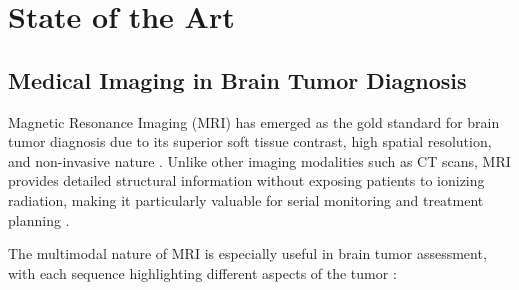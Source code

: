 \chapter{State of the Art}

\section{Medical Imaging in Brain Tumor Diagnosis}

Magnetic Resonance Imaging (MRI) has emerged as the gold standard for brain tumor diagnosis due to its superior soft tissue contrast, high spatial resolution, and non-invasive nature \cite{Bauer2013}. Unlike other imaging modalities such as CT scans, MRI provides detailed structural information without exposing patients to ionizing radiation, making it particularly valuable for serial monitoring and treatment planning \cite{Menze2015}.

The multimodal nature of MRI is especially useful in brain tumor assessment, with each sequence highlighting different aspects of the tumor \cite{Bakas2018}:

